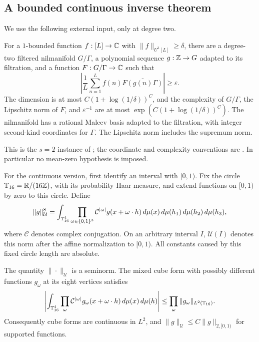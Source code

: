 \subsection{A bounded continuous inverse theorem}

We use the following external input, only at degree two.

\begin{theorem}\label{thm:lss}
For a \(1\)-bounded function \(f:[L]\to\mathbb C\) with
\(\|f\|_{U^3[L]}\ge\delta\), there are a degree-two filtered
nilmanifold \(G/\Gamma\), a polynomial sequence \(g:\mathbb Z\to G\)
adapted to its filtration, and a function \(F:G/\Gamma\to\mathbb C\) such that
\[
 \left|\frac1L\sum_{n=1}^L
        f(n)\overline{F(g(n)\Gamma)}\right|\ge\varepsilon.
\]
The dimension is at most \(C(1+\log(1/\delta))^{C}\), and the complexity
of \(G/\Gamma\), the Lipschitz norm of \(F\), and
\(\varepsilon^{-1}\) are at most
\(\exp(C(1+\log(1/\delta))^C)\).
The nilmanifold has a rational Malcev basis adapted to the filtration,
with integer second-kind coordinates for \(\Gamma\).
The Lipschitz norm includes the supremum norm.
\end{theorem}

This is the \(s=2\) instance of \cite[Theorem 1.2]{LSS2024};
the coordinate and complexity conventions are
\cite[Definitions 2.3--2.4 and 3.3--3.5]{LSS2024}.
In particular no mean-zero hypothesis is imposed.

For the continuous version, first identify an interval with \([0,1)\).
Fix the circle \(\mathbb T_{16}=\mathbb R/(16\mathbb Z)\), with its probability Haar measure,
and extend functions on \([0,1)\) by zero to this circle.  Define
\[
 \|g\|_{\mathcal U}^8
   =\int_{\mathbb T_{16}^4}
       \prod_{\omega\in\{0,1\}^3}
       \mathcal C^{|\omega|}g(x+\omega\cdot h)
                 \,d\mu(x)\,d\mu(h_1)\,d\mu(h_2)\,d\mu(h_3),
\]
where \(\mathcal C\) denotes complex conjugation.
On an arbitrary interval \(I\), \(\mathcal U(I)\) denotes this
norm after the affine normalization to \([0,1)\).
All constants caused by this fixed circle length are absolute.

\begin{lemma}\label{lem:cube-bounds}
The quantity \(\|\cdot\|_{\mathcal U}\) is a seminorm.
The mixed cube form with possibly different functions \(g_\omega\)
at its eight vertices satisfies
\[
 \left|\int_{\mathbb T_{16}^4}
       \prod_\omega\mathcal C^{|\omega|}
            g_\omega(x+\omega\cdot h)\,d\mu(x)\,d\mu(h)\right|
 \le \prod_\omega\|g_\omega\|_{L^2(\mathbb T_{16})}.
\]
Consequently cube forms are continuous in \(L^2\), and
\(\|g\|_{\mathcal U}\le C\|g\|_{2,[0,1)}\) for supported functions.
\end{lemma}

